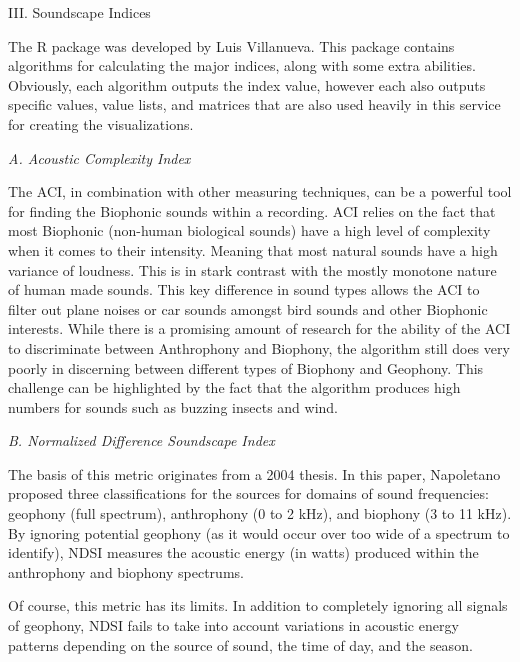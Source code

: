 \begin{center}
III. Soundscape Indices
\end{center}
\begin{flushleft}
\setlength{\parindent}{0.125in}
The  R package was developed by Luis Villanueva. This package contains algorithms for calculating the major indices, along with some extra abilities. Obviously, each algorithm outputs the index value, however each also outputs specific values, value lists, and matrices that are also used heavily in this service for creating the visualizations.\par

\noindent\textit{A. Acoustic Complexity Index}\par
The ACI, in combination with other measuring techniques, can be a powerful tool for finding the Biophonic sounds within a recording. ACI relies on the fact that most Biophonic (non-human biological sounds) have a high level of complexity when it comes to their intensity. Meaning that most natural sounds have a high variance of loudness. This is in stark contrast with the mostly monotone nature of human made sounds. This key difference in sound types allows the ACI to filter out plane noises or car sounds amongst bird sounds and other Biophonic interests. While there is a promising amount of research for the ability of the ACI to discriminate between Anthrophony and Biophony, the algorithm still does very poorly in discerning between different types of Biophony and Geophony. This challenge can be highlighted by the fact that the algorithm produces high numbers for sounds such as buzzing insects and wind.\par

\noindent\textit{B. Normalized Difference Soundscape Index}\par
The basis of this metric originates from a 2004 thesis.\cite{napoletano} In this paper, Napoletano proposed three classifications for the sources for domains of sound frequencies: geophony (full spectrum), anthrophony (0 to 2 kHz), and biophony (3 to 11 kHz). By ignoring potential geophony (as it would occur over too wide of a spectrum to identify), NDSI measures the acoustic energy (in watts) produced within the anthrophony and biophony spectrums.\par
Of course, this metric has its limits. In addition to completely ignoring all signals of geophony, NDSI fails to take into account variations in acoustic energy patterns depending on the source of sound, the time of day, and the season.\par


\end{flushleft}
